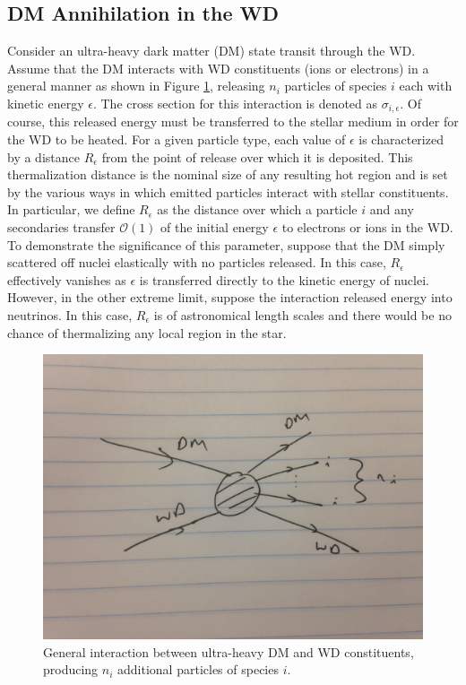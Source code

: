\documentclass[twocolumn,showpacs,preprintnumbers,amsmath,amssymb,prd]{revtex4}
\newcommand{\OO}{\mathcal{O}}
\begin{document}
\subsection{DM Annihilation in the WD}

Consider an ultra-heavy dark matter (DM) state transit through the WD. Assume that the DM interacts with WD constituents (ions or electrons) in a general manner as shown in Figure \ref{fig:feynmandiag}, releasing $n_i$ particles of species $i$ each with kinetic energy $\epsilon$. The cross section for this interaction is denoted as $\sigma_{i,\epsilon}$. Of course, this released energy must be transferred to the stellar medium in order for the WD to be heated. For a given particle type, each value of $\epsilon$ is characterized by a distance $R_\epsilon$ from the point of release over which it is deposited. This thermalization distance is the nominal size of any resulting hot region and is set by the various ways in which emitted particles interact with stellar constituents. In particular, we define $R_\epsilon$ as the distance over which a particle $i$ and any secondaries transfer $\OO(1)$ of the initial energy $\epsilon$ to electrons or ions in the WD. To demonstrate the significance of this parameter, suppose that the DM simply scattered off nuclei elastically with no particles released. In this case, $R_\epsilon$ effectively vanishes as $\epsilon$ is transferred directly to the kinetic energy of nuclei. However, in the other extreme limit, suppose the interaction released energy into neutrinos. In this case, $R_\epsilon$ is of astronomical length scales and there would be no chance of thermalizing any local region in the star.

\begin{figure}
\label{fig:feynmandiag}
\includegraphics[scale=.05]{feynmandiag}
\caption{General interaction between ultra-heavy DM and WD constituents, producing $n_i$ additional particles of species $i$.}
\end{figure}
\end{document}
